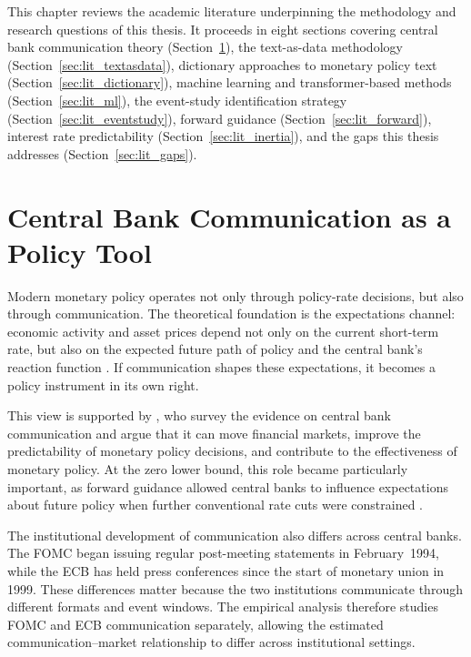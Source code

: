 
This chapter reviews the academic literature underpinning the
methodology and research questions of this thesis. It proceeds in
eight sections covering central bank communication theory
(Section~\ref{sec:lit_communication}), the text-as-data methodology
(Section~\ref{sec:lit_textasdata}), dictionary approaches to
monetary policy text (Section~\ref{sec:lit_dictionary}), machine
learning and transformer-based methods
(Section~\ref{sec:lit_ml}), the event-study identification strategy
(Section~\ref{sec:lit_eventstudy}), forward guidance
(Section~\ref{sec:lit_forward}), interest rate predictability
(Section~\ref{sec:lit_inertia}), and the gaps this thesis addresses
(Section~\ref{sec:lit_gaps}).
 


\section{Central Bank Communication as a Policy Tool}
\label{sec:lit_communication}
Modern monetary policy operates not only through policy-rate decisions,
but also through communication. The theoretical foundation is the
expectations channel: economic activity and asset prices depend not only
on the current short-term rate, but also on the expected future path of
policy and the central bank's reaction function \citep{woodford2005}.
If communication shapes these expectations, it becomes a policy
instrument in its own right.

This view is supported by \citet{blinder2008}, who survey the evidence
on central bank communication and argue that it can move financial
markets, improve the predictability of monetary policy decisions, and
contribute to the effectiveness of monetary policy. At the zero lower
bound, this role became particularly important, as forward guidance
allowed central banks to influence expectations about future policy when
further conventional rate cuts were constrained \citep{campbell2012}.

The institutional development of communication also differs across
central banks. The FOMC began issuing regular post-meeting statements in
February~1994, while the ECB has held press conferences since the start
of monetary union in 1999. These differences matter because the two
institutions communicate through different formats and event windows.
The empirical analysis therefore studies FOMC and ECB communication
separately, allowing the estimated communication--market relationship to
differ across institutional settings.

